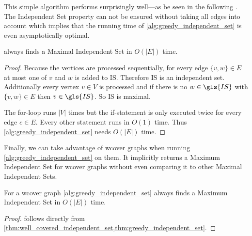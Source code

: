 This simple algorithm performs surprisingly well---as be seen in the
following . The Independent Set
property can not be ensured without taking all edges into account
which implies that the running time of
\cref{alg:greedy_independent_set} is even asymptotically optimal.

\begin{theorem}
  \label{thm:greedy_independent_set}
   always finds a
  Maximal Independent Set in \(O(|E|)\) time.
  \begin{proof}
  Because the vertices are processed sequentially, for every edge
  \(\{v,w\} \in E\) at most one of \(v\) and \(w\) is added to
  \gls{IS}. Therefore \gls{IS} is an independent set. Additionally 
  every vertex \(v \in V\) is processed and if there is no
  \(w \in \gls{IS}\) with \(\{v,w\} \in E\) then \(v \in \gls{IS}\).
  So \gls{IS} is maximal.
  
  The for-loop runs \(|V|\) times but the if-statement is only
  executed twice for every edge \(e \in E\). Every other statement
  runs in \(O(1)\) time. Thus \cref{alg:greedy_independent_set} needs
  \(O(|E|)\) time.
  \end{proof}
\end{theorem}

Finally, we can take advantage of \gls{wcover} graphs when running
\cref{alg:greedy_independent_set} on them. It implicitly returns a
Maximum Independent Set for \gls{wcover} graphs without even
comparing it to other Maximal Independent Sets.

\begin{theorem}
  \label{thm:well_covered_maximum_independent_set}
  For a \gls{wcover} graph \cref{alg:greedy_independent_set} always
  finds a Maximum Independent Set in \(O(|E|)\) time.
  \begin{proof}
   follows directly
  from \cref{thm:well_covered_independent_set,thm:greedy_independent_set}.
  \end{proof}
\end{theorem}

